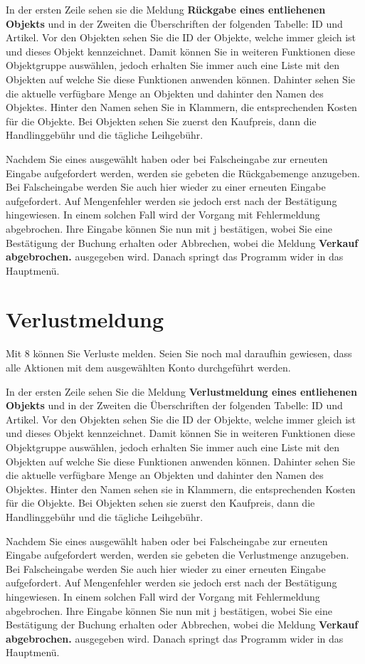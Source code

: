 ﻿\documentclass[a4paper,12pt,titlepage]{article}
\newcommand\enquote[1]{{\ttfamily \bfseries #1}}
\begin{document}
In der ersten Zeile sehen sie die Meldung \enquote{Rückgabe eines entliehenen Objekts}
 und in der Zweiten die Überschriften der folgenden Tabelle: ID und Artikel.
Vor den Objekten sehen Sie die ID der Objekte, welche immer gleich ist und dieses Objekt kennzeichnet.
Damit können Sie in weiteren Funktionen diese Objektgruppe auswählen,
 jedoch erhalten Sie immer auch eine Liste mit den Objekten auf welche Sie diese Funktionen anwenden können.
Dahinter sehen Sie die aktuelle verfügbare Menge an Objekten und dahinter den Namen des Objektes.
Hinter den Namen sehen Sie in Klammern, die entsprechenden Kosten für die Objekte.
Bei Objekten sehen Sie zuerst den Kaufpreis, dann die Handlinggebühr und die tägliche Leihgebühr.

Nachdem Sie eines ausgewählt haben oder bei Falscheingabe zur erneuten Eingabe aufgefordert werden,
 werden sie gebeten die Rückgabemenge anzugeben.
Bei Falscheingabe werden Sie auch hier wieder zu einer erneuten Eingabe aufgefordert.
Auf Mengenfehler werden sie jedoch erst nach der Bestätigung hingewiesen.
In einem solchen Fall wird der Vorgang mit Fehlermeldung abgebrochen.
Ihre Eingabe können Sie nun mit j bestätigen,
 wobei Sie eine Bestätigung der Buchung erhalten oder Abbrechen,
 wobei die Meldung \enquote{Verkauf abgebrochen.} ausgegeben wird.
Danach springt das Programm wider in das Hauptmenü.
\section{Verlustmeldung}
Mit 8 können Sie Verluste melden.
Seien Sie noch mal daraufhin gewiesen, dass alle Aktionen mit dem ausgewählten Konto durchgeführt werden.

In der ersten Zeile sehen Sie die Meldung \enquote{Verlustmeldung eines entliehenen Objekts}
 und in der Zweiten die Überschriften der folgenden Tabelle: ID und Artikel.
Vor den Objekten sehen Sie die ID der Objekte, welche immer gleich ist und dieses Objekt kennzeichnet.
Damit können Sie in weiteren Funktionen diese Objektgruppe auswählen,
jedoch erhalten Sie immer auch eine Liste mit den Objekten auf welche Sie diese Funktionen anwenden können.
Dahinter sehen Sie die aktuelle verfügbare Menge an Objekten und dahinter den Namen des Objektes.
Hinter den Namen sehen sie in Klammern, die entsprechenden Kosten für die Objekte.
Bei Objekten sehen sie zuerst den Kaufpreis, dann die Handlinggebühr und die tägliche Leihgebühr.

Nachdem Sie eines ausgewählt haben oder bei Falscheingabe zur erneuten Eingabe aufgefordert werden,
 werden sie gebeten die Verlustmenge anzugeben.
Bei Falscheingabe werden Sie auch hier wieder zu einer erneuten Eingabe aufgefordert.
Auf Mengenfehler werden sie jedoch erst nach der Bestätigung hingewiesen.
In einem solchen Fall wird der Vorgang mit Fehlermeldung abgebrochen.
Ihre Eingabe können Sie nun mit j bestätigen, wobei Sie eine Bestätigung der Buchung erhalten oder Abbrechen,
 wobei die Meldung \enquote{Verkauf abgebrochen.} ausgegeben wird.
Danach springt das Programm wider in das Hauptmenü.
\end{document}
